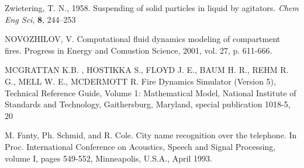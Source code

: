 \begin{thebibliography}{99}


 Zwietering, T. N., 1958. Suspending of solid particles in liquid by agitators. \textit{Chem Eng Sci}, \textbf{8}, 244--253 

 NOVOZHILOV, V. Computational fluid dynamics modeling of compartment fires. Progress in Energy and Comustion Science, 2001, vol. 27, p. 611-666.

 MCGRATTAN K.B. , HOSTIKKA S., FLOYD J. E., BAUM H. R., REHM R. G.,
MELL W. E., MCDERMOTT R. Fire Dynamics Simulator (Version 5), Technical Reference Guide, Volume 1: Mathematical Model, National Institute of Standards and Technology, Gaithersburg, Maryland, special publication 1018-5, 20

 M. Fanty, Ph. Schmid, and R. Cole. City name recognition over the telephone. In Proc. International Conference on Acoustics, Speech and Signal Processing, volume I, pages 549-552, Minneapolis, U.S.A., April 1993. 

\end{thebibliography}
